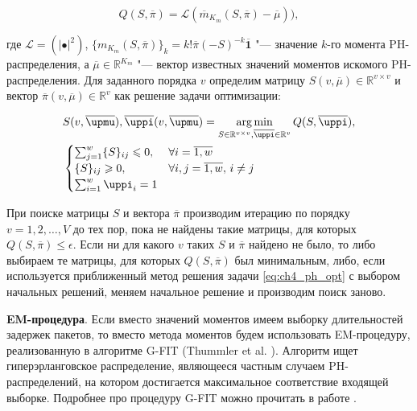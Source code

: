 \begin{equation}
  \label{eq:ch4_relay_var}
  Q(S, \overline\pi) = \mathcal{L}(\overline{m}_{K_m}(S, \overline\pi) - \overline{\mu})),
\end{equation}

где $\mathcal{L} = (|\bullet|^2)$, $\{m_{K_m}(S, \overline\pi)\}_k = k! \overline\pi (-S)^{-k} \overline{\mathbf{1}}$ "--- значение $k$-го момента PH-распределения, а $\overline\mu \in \mathbb{R}^{K_m}$ "--- вектор известных значений моментов искомого PH-распределения. Для заданного порядка $v$ определим матрицу $S(v, \overline{\mu}) \in \mathbb{R}^{v \times v}$ и вектор $\overline\pi(v, \overline{\mu}) \in \mathbb{R}^v$ как решение задачи оптимизации:

\begin{equation}
  \label{eq:ch4_ph_opt}
  \begin{aligned}
    &S(v, \overline\mu), \overline\pi(v, \overline\mu) = \argmin\limits_{S \in \mathbb{R}^{v \times v},\overline\pi \in \mathbb{R}^v} Q(S, \overline\pi),\\
    &\begin{cases}
	    \sum_{j = 1}^{w} \{S\}_{ij} \leqslant 0,&\forall i = \overline{1,w}\\
	    \{S\}_{ij} \geqslant 0,&\forall i,j = \overline{1,w},\,i \neq j\\
	    \sum_{i=1}^{w} \pi_i = 1&
    \end{cases}
  \end{aligned}
\end{equation}

При поиске матрицы $S$ и вектора $\overline\pi$ производим итерацию по порядку $v = 1,2, \dots, V$ до тех пор, пока не найдены такие матрицы, для которых $Q(S, \overline\pi) \leqslant \epsilon$. Если ни для какого $v$ таких $S$ и $\overline\pi$ найдено не было, то либо выбираем те матрицы, для которых $Q(S, \overline\pi)$ был минимальным, либо, если используется приближенный метод решения задачи \eqref{eq:ch4_ph_opt} с выбором начальных решений, меняем начальное решение и производим поиск заново.


\textbf{EM-процедура}. Если вместо значений моментов имеем выборку длительностей задержек пакетов, то вместо метода моментов будем использовать EM-процедуру, реализованную в алгоритме G-FIT (Thummler et al. \cite{Thummler2005}). Алгоритм ищет гиперэрланговское распределение, являющееся частным случаем PH-распределений, на котором достигается максимальное соответствие входящей выборке. Подробнее про процедуру G-FIT можно прочитать в работе \cite{Thummler2005}.


